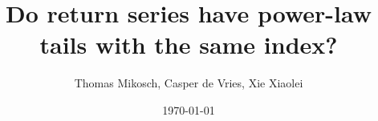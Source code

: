 \documentclass[11pt,a4]{amsart}
\begin{document}
\title{Do return series have power-law tails with the same index?}
\author{Thomas Mikosch, Casper de Vries, Xie Xiaolei}
\date{\today}

\maketitle





\end{document}
